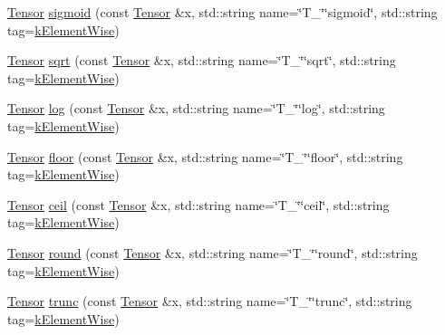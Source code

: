 \begin{DoxyCompactItemize}
\hyperlink{classtvm_1_1te_1_1Tensor}{Tensor} \hyperlink{namespacetopi_a15b253d8fcbcef6ff51ed961e3335305}{sigmoid} (const \hyperlink{classtvm_1_1te_1_1Tensor}{Tensor} \&x, std\+::string name=\char`\"{}T\+\_\+\char`\"{}\char`\"{}sigmoid\char`\"{}, std\+::string tag=\hyperlink{namespacetopi_ac1b34ed59d38a5f5338bee6b2cad42be}{k\+Element\+Wise})
\item 
\hyperlink{classtvm_1_1te_1_1Tensor}{Tensor} \hyperlink{namespacetopi_a99c914006a93f0a67619105c8a9c60dc}{sqrt} (const \hyperlink{classtvm_1_1te_1_1Tensor}{Tensor} \&x, std\+::string name=\char`\"{}T\+\_\+\char`\"{}\char`\"{}sqrt\char`\"{}, std\+::string tag=\hyperlink{namespacetopi_ac1b34ed59d38a5f5338bee6b2cad42be}{k\+Element\+Wise})
\item 
\hyperlink{classtvm_1_1te_1_1Tensor}{Tensor} \hyperlink{namespacetopi_ac2472cb0d5b8deb69bde85866e712863}{log} (const \hyperlink{classtvm_1_1te_1_1Tensor}{Tensor} \&x, std\+::string name=\char`\"{}T\+\_\+\char`\"{}\char`\"{}log\char`\"{}, std\+::string tag=\hyperlink{namespacetopi_ac1b34ed59d38a5f5338bee6b2cad42be}{k\+Element\+Wise})
\item 
\hyperlink{classtvm_1_1te_1_1Tensor}{Tensor} \hyperlink{namespacetopi_acd86f6a79bf0f7cdb1296ae7829f8307}{floor} (const \hyperlink{classtvm_1_1te_1_1Tensor}{Tensor} \&x, std\+::string name=\char`\"{}T\+\_\+\char`\"{}\char`\"{}floor\char`\"{}, std\+::string tag=\hyperlink{namespacetopi_ac1b34ed59d38a5f5338bee6b2cad42be}{k\+Element\+Wise})
\item 
\hyperlink{classtvm_1_1te_1_1Tensor}{Tensor} \hyperlink{namespacetopi_a4766e1050dc67d63cb8a945d1fbb4a27}{ceil} (const \hyperlink{classtvm_1_1te_1_1Tensor}{Tensor} \&x, std\+::string name=\char`\"{}T\+\_\+\char`\"{}\char`\"{}ceil\char`\"{}, std\+::string tag=\hyperlink{namespacetopi_ac1b34ed59d38a5f5338bee6b2cad42be}{k\+Element\+Wise})
\item 
\hyperlink{classtvm_1_1te_1_1Tensor}{Tensor} \hyperlink{namespacetopi_a52c0e224551415ba90fb1a3f5db288c0}{round} (const \hyperlink{classtvm_1_1te_1_1Tensor}{Tensor} \&x, std\+::string name=\char`\"{}T\+\_\+\char`\"{}\char`\"{}round\char`\"{}, std\+::string tag=\hyperlink{namespacetopi_ac1b34ed59d38a5f5338bee6b2cad42be}{k\+Element\+Wise})
\item 
\hyperlink{classtvm_1_1te_1_1Tensor}{Tensor} \hyperlink{namespacetopi_aa1c0d966d270dcd7802f765886baf5b5}{trunc} (const \hyperlink{classtvm_1_1te_1_1Tensor}{Tensor} \&x, std\+::string name=\char`\"{}T\+\_\+\char`\"{}\char`\"{}trunc\char`\"{}, std\+::string tag=\hyperlink{namespacetopi_ac1b34ed59d38a5f5338bee6b2cad42be}{k\+Element\+Wise})

\end{DoxyCompactItemize}
